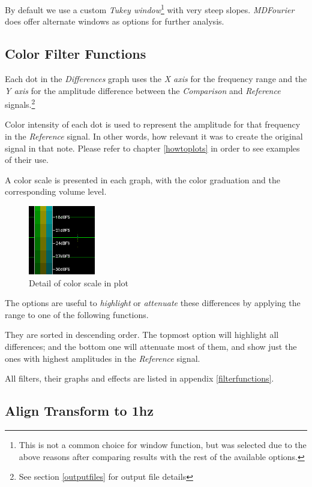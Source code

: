 \documentclass[10pt,a4paper]{report}
\begin{document}
By default we use a custom \textit{Tukey window}\footnote{This is not a common choice for window function, but was selected due to the above reasons after comparing results with  the rest of the available options.} with very steep slopes. \textit{MDFourier} does offer alternate windows as options for further analysis.

\subsection{Color Filter Functions}
\label{colorfilter}

Each dot in the \textit{Differences} graph uses the \textit{X axis} for the frequency range and the \textit{Y axis} for the amplitude difference between the \textit{Comparison} and \textit{Reference} signals.\footnote{See section \ref{outputfiles} for output file details}

Color intensity of each dot is used to represent the amplitude for that frequency in the \textit{Reference} signal. In other words, how relevant it was to create the original signal in that note. Please refer to chapter \ref{howtoplots} in order to see examples of their use.

A color scale is presented in each graph, with the color graduation and the corresponding volume level.

\begin{figure}[H]
	\centering
	\includegraphics[width=0.2\linewidth]{images/colorfilter/colorscale.png}
	\caption[Plot color scale]{Detail of color scale in plot}
	\label{fig:colorscale}
\end{figure}

The options are useful to \textit{highlight} or \textit{attenuate} these differences by applying the range to one of the following functions. 

They are sorted in descending order. The topmost option will highlight all differences; and the bottom one will attenuate most of them, and show just the ones with highest amplitudes in the \textit{Reference} signal.

All filters, their graphs and effects are listed in appendix \ref{filterfunctions}.

\subsection{Align Transform to 1hz}
\end{document}
